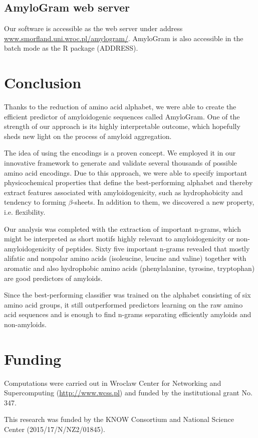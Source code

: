 \documentclass[a4,center,fleqn]{NAR}
\begin{document}
\subsection{AmyloGram web server}

Our software is accessible as the web server under address \url{www.smorfland.uni.wroc.pl/amylogram/}. AmyloGram is also
accessible in the batch mode as the R package (ADDRESS). 

\section{Conclusion}

Thanks to the reduction of amino acid alphabet, we were able to create the 
efficient predictor of amyloidogenic sequences called AmyloGram. One of the 
strength of our approach is its highly interpretable outcome, which hopefully 
sheds new light on the process of amyloid aggregation.

  The idea of using the encodings is a proven concept. We employed it in our 
innovative framework to generate and validate several thousands of possible 
amino acid encodings. Due to this approach, we were able to specify important 
physicochemical properties that define the best-performing alphabet and thereby extract features associated with amyloidogenicity, such as hydrophobicity and tendency to forming $\beta$-sheets.  In addition to them, we discovered a new property,  i.e. flexibility.  

  Our analysis was completed with the extraction of important n-grams, which 
might be interpreted as short motifs highly relevant to amyloidogenicity or 
non-amyloidogenicity of peptides. Sixty five important n-grams revealed that mostly 
alifatic and nonpolar amino acids (isoleucine, leucine and valine) together with aromatic and also hydrophobic amino acids (phenylalanine, tyrosine, tryptophan) are good predictors of amyloids.

  Since the best-performing classifier was trained on the alphabet consisting of  
six amino acid groups, it still outperformed predictors learning on the raw amino acid sequences and is enough to find n-grams separating efficiently amyloids and non-amyloids. 


\section*{Funding}

Computations were carried out in Wroclaw Center for Networking 
and Supercomputing (\url{http://www.wcss.pl}) and funded by the
institutional grant No. 347.

This research was funded by the KNOW Consortium and
National Science Center (2015/17/N/NZ2/01845).



\end{document}
